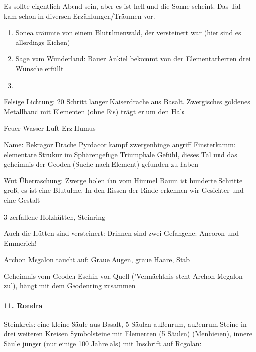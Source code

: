 Es sollte eigentlich Abend sein, aber es ist hell und die Sonne scheint. Das Tal kam schon in diversen Erzählungen/Träumen vor.
\begin{enumerate}
\item Sonea träumte von einem Blutulmenwald, der versteinert war (hier sind es allerdings Eichen)
\item Sage vom Wunderland: Bauer Ankiel bekommt von den Elementarherren drei Wünsche erfüllt
\item 
\end{enumerate}

Felsige Lichtung: 20 Schritt langer Kaiserdrache aus Basalt. Zwergisches goldenes Metallband mit Elementen (ohne Eis) trägt er um den Hals 

Feuer Wasser Luft Erz Humus

Name: Bekragor
Drache Pyrdacor kampf
zwergenbinge angriff 
Finsterkamm: elementare Strukur im Sphärengefüge 
Triumphale Gefühl, dieses Tal und das geheimnis der Geoden (Suche nach Element) gefunden zu haben

Wut
Überraschung: Zwerge holen ihn vom Himmel 
Baum ist hunderte Schritte groß, es ist eine Blutulme. In den Rissen der Rinde erkennen wir Gesichter und eine Gestalt

3 zerfallene Holzhütten, Steinring 

Auch die Hütten sind versteinert: Drinnen sind zwei Gefangene: Ancoron und Emmerich!

Archon Megalon taucht auf: Graue Augen, graue Haare, Stab

Geheimnis vom Geoden Eschin von Quell ('Vermächtnis steht Archon Megalon zu'), hängt mit dem Geodenring zusammen  

\paragraph{11. Rondra}
Steinkreis: eine kleine Säule aus Basalt, 5 Säulen außenrum, außenrum Steine in drei weiteren Kreisen Symbolsteine mit Elementen (5 Säulen) (Menhieren), innere Säule jünger (nur einige 100 Jahre als) mit Inschrift auf Rogolan: 


